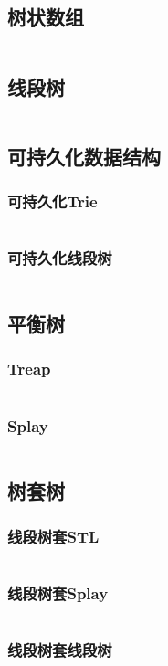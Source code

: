 \documentclass[a4paper,10pt]{article}
\begin{document}
\subsection{树状数组}
\inputminted[breaklines, linenos]{c++}{ds/tree_array.cc}
\subsection{线段树}
\inputminted[breaklines, linenos]{c++}{ds/seg_tree.cc}
\subsection{可持久化数据结构}
\subsubsection{可持久化Trie}
\inputminted[breaklines, linenos]{c++}{ds/last_trie.cc}
\subsubsection{可持久化线段树}
\inputminted[breaklines, linenos]{c++}{ds/last_seg.cc}
\subsection{平衡树}
\subsubsection{Treap}
\inputminted[breaklines, linenos]{c++}{ds/treap.cc}
\subsubsection{Splay}
\inputminted[breaklines, linenos]{c++}{ds/splay.cc}
\subsection{树套树}
\subsubsection{线段树套STL}
\inputminted[breaklines, linenos]{c++}{ds/stl_in_seg.cc}
\subsubsection{线段树套Splay}
\inputminted[breaklines, linenos]{c++}{ds/splay_in_seg.cc}
\subsubsection{线段树套线段树}
\inputminted[breaklines, linenos]{c++}{ds/seg_in_seg.cc}
\end{document}
